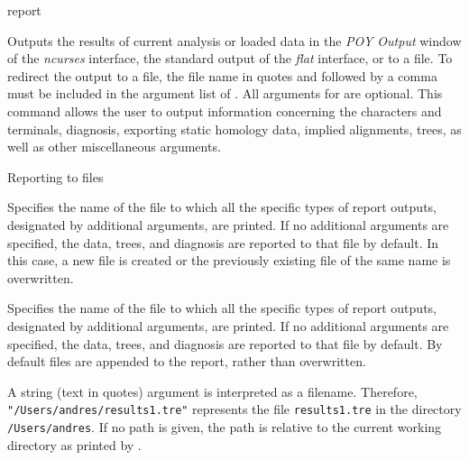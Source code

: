 \begin{command}{report}{}


    \begin{poydescription} 
        Outputs the results of current analysis or loaded data in the \emph{POY Output}
        window of the \emph{ncurses} interface, the standard output of the \emph{flat}
        interface, or to a file. To redirect the output to a file, the file name in 
        quotes and followed by a comma must be included in the argument list
        of . All arguments for  are
        optional.  This command allows the user to output information concerning the 
        characters and terminals, diagnosis, exporting static homology data, implied 
        alignments, trees, as well as other miscellaneous arguments.
    \end{poydescription}

    \begin{arguments}

        \begin{argumentgroup}{Reporting to files}{}

                {Specifies the name of the file to which all the specific types of report outputs,
                designated by additional arguments, are printed. If no additional arguments
                are specified, the data, trees, and diagnosis are reported to that file by
                default. In this case, a new file is created or the previously 
                existing file of the same name is overwritten.} 
                {}

                {Specifies the name of the file to which all the specific types of report outputs,
                designated by additional arguments, are printed. If no additional arguments
                are specified, the data, trees, and diagnosis are reported to that file by
                default. By default files are appended to the report, rather than overwritten.
                
                A string (text in quotes) argument is interpreted as a filename.
                Therefore, \texttt{"/Users/andres/results1.tre"} represents  the file \texttt{results1.tre} in
                the directory \texttt{/Users/andres}. If no path is given, the path
                is relative to the current working directory as printed by .} 
                {}
                

\end{argumentgroup}
\end{arguments}
\end{command}

